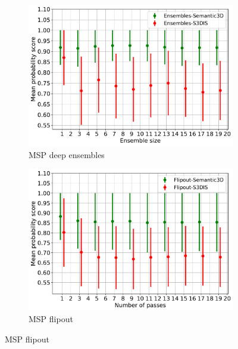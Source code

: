     \begin{figure}[!ht]
        \centering
        \begin{subfigure}{0.98\textwidth}
        \includegraphics[scale=0.6]{images/MSP/Ensembles_MSP_cnc.pdf}
        \caption{MSP deep ensembles}
        \label{fig:msp_ensembles}
        \end{subfigure}
        \begin{subfigure}{0.98\textwidth}
        \includegraphics[scale=0.6]{images/MSP/Flipout_MSP_cnc.pdf}
        \caption{MSP flipout}
        \label{fig:msp_flipout}
        \end{subfigure}
    \end{figure}

